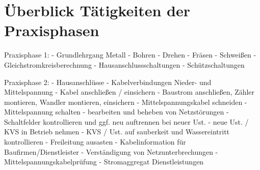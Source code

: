 \chapter*{Überblick Tätigkeiten der Praxisphasen} %

Praxisphase 1:
- Grundlehrgang Metall
- Bohren
- Drehen
- Fräsen
- Schweißen
- Gleichstromkreisberechnung
- Hausanschlussschaltungen
- Schützschaltungen

Praxisphase 2:
- Hausanschlüsse
- Kabelverbindungen Nieder- und Mittelspannung
- Kabel anschließen / einsichern
- Baustrom anschließen, Zähler montieren, Wandler montieren, einsichern
- Mittelspannungskabel schneiden
- Mittelspannung schalten
- bearbeiten und beheben von Netzstörungen
- Schaltfelder kontrollieren und ggf. neu auftrennen bei neuer Ust.
- neue Ust. / KVS in Betrieb nehmen
- KVS / Ust. auf sauberkeit und Wassereintritt kontrollieren
- Freileitung ausasten
- Kabelinformation für Baufirmen/Dienstleister
- Verständigung von Netzunterbrechungen
- Mittelspannungskabelprüfung
- Stromaggregat Dienstleistungen

\cleardoublepage

